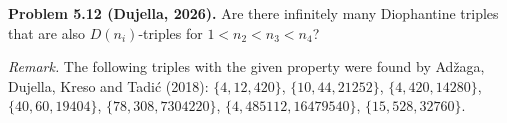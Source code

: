 \textbf{Problem 5.12 (Dujella, 2026).} Are there infinitely many Diophantine triples that are also $D(n_i)$-triples for $1<n_2<n_3<n_4$?

\medskip

\textit{Remark.} The following triples with the given property were found by Adžaga, Dujella, Kreso and Tadić (2018): $\{4,12,420\}$, $\{10,44,21252\}$, $\{4,420,14280\}$, $\{40,60,19404\}$, $\{78,308,7304220\}$, $\{4,485112,16479540\}$, $\{15,528,32760\}$.
